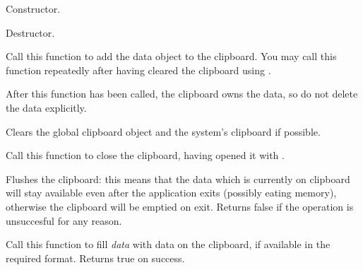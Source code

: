 
Constructor.



Destructor.

\label{wxclipboardadddata}


Call this function to add the data object to the clipboard. You may call
this function repeatedly after having cleared the clipboard using .

After this function has been called, the clipboard owns the data, so do not delete
the data explicitly.



\label{wxclipboardclear}


Clears the global clipboard object and the system's clipboard if possible.

\label{wxclipboardclose}


Call this function to close the clipboard, having opened it with .

\label{wxclipboardflush}


Flushes the clipboard: this means that the data which is currently on
clipboard will stay available even after the application exits (possibly
eating memory), otherwise the clipboard will be emptied on exit.
Returns false if the operation is unsuccesful for any reason.

\label{wxclipboardgetdata}


Call this function to fill {\it data} with data on the clipboard, if available in the required
format. Returns true on success.

\label{wxclipboardisopened}

